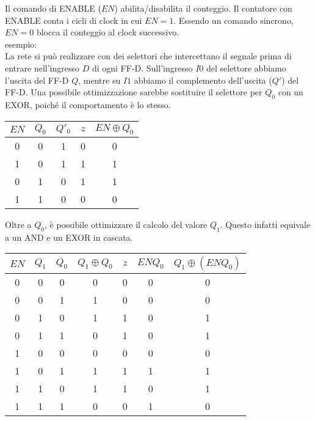 \documentclass{article}
\begin{document}
Il comando di ENABLE ($EN$) abilita/disabilita il conteggio.
Il contatore con ENABLE conta i cicli di clock in cui $EN=1$.
Essendo un comando sincrono, $EN=0$ blocca il conteggio al clock successivo.\\

\noindent
esempio:\\

\noindent
La rete si può realizzare con dei selettori che intercettano il segnale prima di entrare nell'ingresso $D$ di ogni FF-D.
Sull'ingresso $I0$ del selettore abbiamo l'uscita del FF-D $Q$, mentre su $I1$ abbiamo il complemento dell'uscita ($Q'$) del FF-D.
Una possibile ottimizzazione sarebbe sostituire il selettore per $Q_0$ con un EXOR, poiché il comportamento è lo stesso.

\begin{center}
\begin{tabular}{ |c|c|c|c|c| }
\hline
$EN$ & $Q_0$ & $Q'_0$ & $z$ & $EN \oplus Q_0$ \\
\hline
\hline
0 & 0 & 1 & 0 & 0 \\
1 & 0 & 1 & 1 & 1 \\
0 & 1 & 0 & 1 & 1 \\
1 & 1 & 0 & 0 & 0 \\
\hline
\end{tabular}
\end{center}

\noindent
Oltre a $Q_0$, è possibile ottimizzare il calcolo del valore $Q_1$.
Questo infatti equivale a un AND e un EXOR in cascata.

\begin{center}
\begin{tabular}{ |c|c|c|c|c|c|c| }
\hline
$EN$ & $Q_1$ & $Q_0$ & $Q_1 \oplus Q_0$ & $z$ & $EN Q_0$ & $Q_1 \oplus (EN Q_0)$ \\
\hline
\hline
0 & 0 & 0 & 0 & 0 & 0 & 0 \\
0 & 0 & 1 & 1 & 0 & 0 & 0 \\
0 & 1 & 0 & 1 & 1 & 0 & 1 \\
0 & 1 & 1 & 0 & 1 & 0 & 1 \\
1 & 0 & 0 & 0 & 0 & 0 & 0 \\
1 & 0 & 1 & 1 & 1 & 1 & 1 \\
1 & 1 & 0 & 1 & 1 & 0 & 1 \\
1 & 1 & 1 & 0 & 0 & 1 & 0 \\
\hline
\end{tabular}
\end{center}
\end{document}
